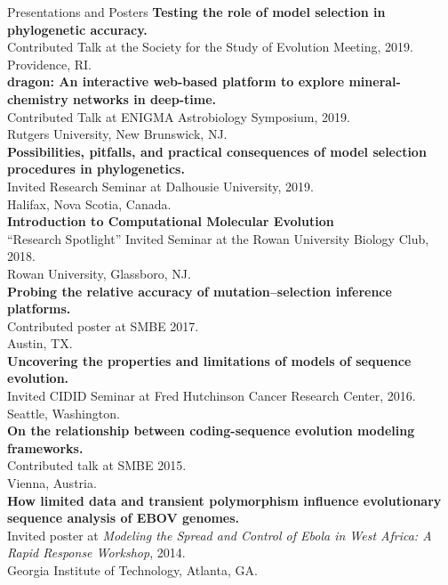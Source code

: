 \documentclass{resume} %
\begin{document}
\begin{rSection}{Presentations and Posters}
\textbf{Testing the role of model selection in phylogenetic accuracy.}
\\ Contributed Talk at the Society for the Study of Evolution Meeting, 2019.
\\ Providence, RI.\\

\textbf{dragon: An interactive web-based platform to explore mineral-chemistry networks in deep-time.} 
\\ Contributed Talk at ENIGMA Astrobiology Symposium, 2019.
\\ Rutgers University, New Brunswick, NJ.\\


\textbf{Possibilities, pitfalls, and practical consequences of model selection procedures in phylogenetics.}
\\Invited Research Seminar at Dalhousie University, 2019.
\\ Halifax, Nova Scotia, Canada.\\

\textbf{Introduction to Computational Molecular Evolution}
\\``Research Spotlight'' Invited Seminar at the Rowan University Biology Club, 2018.
\\ Rowan University, Glassboro, NJ.\\

\textbf{Probing the relative accuracy of mutation--selection inference platforms.}
\\Contributed poster at SMBE 2017.
\\ Austin, TX.\\

\textbf{Uncovering the properties and limitations of models of sequence evolution.}
\\Invited CIDID Seminar at Fred Hutchinson Cancer Research Center, 2016.
\\ Seattle, Washington.\\

\textbf{On the relationship between coding-sequence evolution modeling frameworks.}
\\Contributed talk at SMBE 2015.
\\ Vienna, Austria.\\

\textbf{How limited data and transient polymorphism influence evolutionary sequence analysis of EBOV genomes.}
\\Invited poster at \emph{Modeling the Spread and Control of Ebola in West Africa: A Rapid Response Workshop}, 2014.
\\ Georgia Institute of Technology, Atlanta, GA.\\


\end{rSection}
\end{document}
